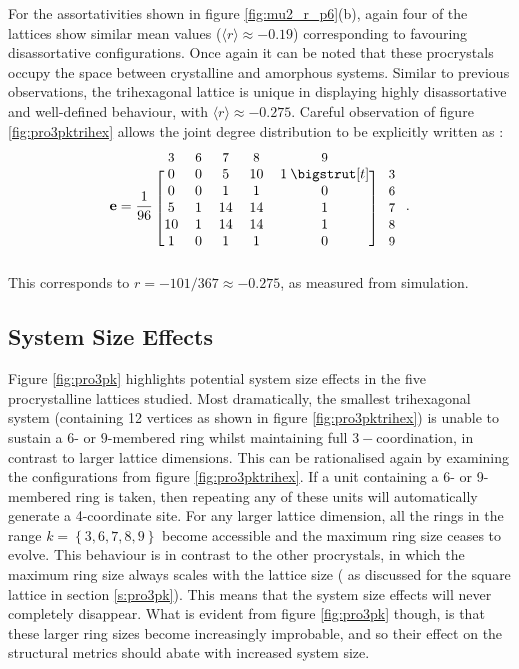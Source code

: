 For the assortativities shown in figure \ref{fig:mu2_r_p6}(b), again four of the lattices show similar mean values ($\langle r \rangle\approx -0.19$) corresponding to favouring disassortative configurations. 
Once again it can be noted that these procrystals occupy the space between crystalline and amorphous systems.
Similar to previous observations, the trihexagonal lattice is unique in displaying highly disassortative and well\--defined behaviour, with $\langle r \rangle \approx -0.275$.
Careful observation of figure \ref{fig:pro3pktrihex} allows the joint degree distribution to be explicitly written as :
\begin{equation}
	\mathbf{e} = \frac{1}{96}\: \begin{blockarray}{*{5}{c} l}
	\begin{block}{*{5}{>{$\footnotesize}c<{$}} l}
	3 & 6 & 7 & 8 & 9 \\
	\end{block}
	\begin{block}{[*{5}{c}]>{$\footnotesize}l<{$}}
	0 & 0 & 5 & 10 & 1\: \bigstrut[t]& \:3\\
	0 & 0 & 1 & 1 & 0 & \:6 \\
	5 & 1 & 14 & 14 & 1 & \:7\\
	10 & 1 & 14 & 14 & 1 & \:8\\
	1 & 0 & 1 & 1 & 0 & \:9\\
	\end{block}
	\end{blockarray}\,.
\end{equation} 
This corresponds to $r=-101/367\approx -0.275$, as measured from simulation.

\subsection{System Size Effects}

Figure \ref{fig:pro3pk} highlights potential system size effects in the five procrystalline lattices studied.
Most dramatically, the smallest trihexagonal system (containing 12 vertices as shown in figure \ref{fig:pro3pktrihex}) is unable to sustain a $6$\-- or $9$\--membered ring whilst maintaining full $3-$coordination, in contrast to larger lattice dimensions.
This can be rationalised again by examining the configurations from figure \ref{fig:pro3pktrihex}.
If a unit containing a 6\-- or 9\--membered ring is taken, then repeating any of these units will automatically generate a 4\--coordinate site. 
For any larger lattice dimension, all the rings in the range $k=\left\{3,6,7,8,9\right\}$ become accessible and the maximum ring size ceases to evolve.
This behaviour is in contrast to the other procrystals, in which the maximum ring size always scales with the lattice size (\eg{} as discussed for the square lattice in section \ref{s:pro3pk}).
This means that the system size effects will never completely disappear.
What is evident from figure \ref{fig:pro3pk} though, is that these larger ring sizes become increasingly improbable, and so their effect on the structural metrics should abate with increased system size.

